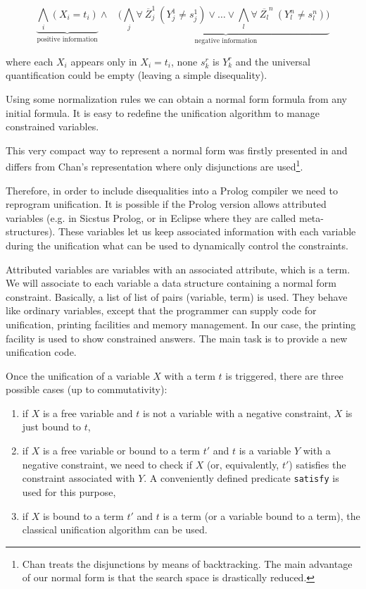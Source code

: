 \documentclass{llncs}
\begin{document}
\[ \underbrace{\bigwedge_i (X_i = t_i)}_{\mbox{positive information}} \wedge~~~~ (
\underbrace{\bigwedge_j \forall~ \overline{Z}_j^1~(Y_j^1 \neq s_j^1)
\vee \ldots \vee \bigwedge_l \forall~ \overline{Z_l}^n~(Y_l^n
\neq s_l^n) )}_{\mbox{negative information}} \]

\noindent
where each $X_i$ appears only in $X_i = t_i$, none $s_k^r$ is $Y_k^r$
and the universal quantification could be
empty (leaving a simple disequality).

Using some normalization rules we can obtain a normal form
formula from any initial formula. It is easy to redefine
the unification algorithm to manage constrained variables.

This very compact way to represent a normal form was firstly presented in
\cite{Moreno1} and differs from Chan's representation where
only disjunctions are used\footnote{Chan treats the disjunctions
by means of backtracking. The main advantage of our normal form is
that the search space is drastically reduced.}.

Therefore, in order to include disequalities into a Prolog compiler we
need to reprogram unification. It is possible if the Prolog version
allows attributed variables \cite{Carlsson} (e.g. in Sicstus Prolog,
or in Eclipse where they are called meta-structures). These variables
let us keep associated information with each variable during the
unification what can be used to dynamically control the constraints.

Attributed variables are variables with an associated attribute, which
is a term. We will associate to each variable a data structure
containing a normal form constraint. Basically, a list of list of
pairs (variable, term) is used. They behave like ordinary variables,
except that the programmer can supply code for unification, printing
facilities and memory management.  In our case, the printing facility
is used to show constrained answers. The main task is to provide a new
unification code.

Once the unification of a variable $X$ with a term $t$ is
triggered, there are three possible cases (up to
commutativity):

\begin{enumerate}
\item if $X$ is a free variable and $t$ is not a variable with a negative
constraint, $X$ is just bound to $t$,
\item if $X$ is a free variable or bound to a term $t'$ and
$t$ is a variable $Y$ with a negative constraint, we need to check
if $X$ (or, equivalently, $t'$) satisfies the constraint associated with $Y$.
A conveniently defined predicate {\tt satisfy} is used for this purpose,
\item if $X$ is bound to a term $t'$ and $t$ is a term (or a variable
bound to a term), the classical unification algorithm can be used.
\end{enumerate}
\end{document}
